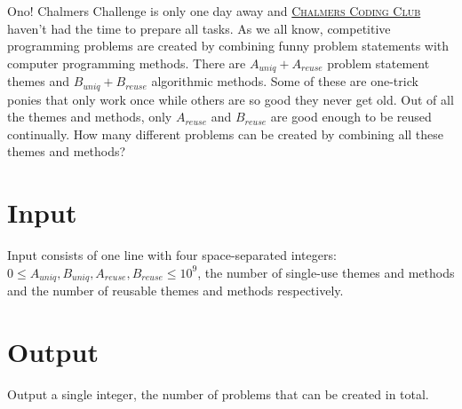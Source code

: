 
Ono! Chalmers Challenge is only one day away and
\href{https://codingclub.chs.chalmers.se/}{\textsc{Chalmers Coding Club}}
haven’t had the time to prepare all tasks. As we all know, competitive
programming problems are created by combining funny problem statements with
computer programming methods. There are $A_{uniq}+A_{reuse}$ problem statement
themes and $B_{uniq}+B_{reuse}$ algorithmic methods. Some of these are one-trick
ponies that only work once while others are so good they never get old. Out of
all the themes and methods, only $A_{reuse}$ and $B_{reuse}$ are good enough to
be reused continually. How many different problems can be created by combining
all these themes and methods?

\section*{Input}
Input consists of one line with four space-separated integers: $0 \le A_{uniq},
B_{uniq}, A_{reuse}, B_{reuse} \le 10^9$, the number of single-use themes and
methods and the number of reusable themes and methods respectively.

\section*{Output}
Output a single integer, the number of problems that can be created in total.
